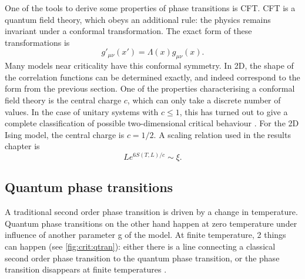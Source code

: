 One of the tools to derive some properties of phase transitions is \Gls{CFT}. \Gls{CFT} is a quantum field theory, which obeys an additional rule: the physics remains invariant under a conformal transformation. The exact form of these transformations is
\begin{equation}
  g'_{\mu \nu}(x') = \Lambda(x) g_{\mu \nu}(x) .
\end{equation}
Many models near criticality have this conformal symmetry. In 2D, the shape of the correlation functions can be determined exactly, and indeed correspond to the form from the previous section. One of the properties characterising a conformal field theory is the central charge $c$, which can only take a discrete number of values.  In the case of unitary systems with $c \leq  1$, this has  turned out to give a complete classification of possible two-dimensional critical behaviour \cite{Ginsparg1988}. For the 2D Ising model, the central charge is $c=1/2$. A scaling relation used in the results chapter is \cite{Calabrese}
\begin{equation}
  L e^{  6 S( T,L ) /c }  \sim   \xi .
\end{equation}

\subsection{Quantum phase transitions}

A traditional second order phase transition is driven by a change in temperature. Quantum phase transitions on the other hand happen at zero temperature under influence of another parameter g of the model. At finite temperature, 2 things can happen (see \cref{fig:crit:qtran}): either there is a line connecting a classical second order phase transition to the quantum phase transition, or the phase transition disappears at finite temperatures \cite{Sachdev1999}.

